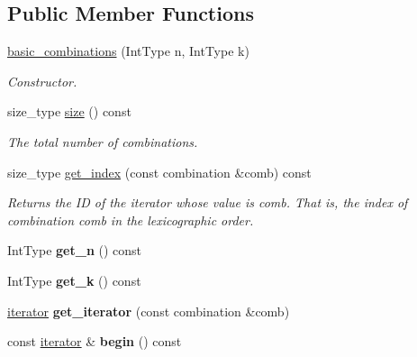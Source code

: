 \subsection*{Public Member Functions}
\begin{DoxyCompactItemize}
\item 
\hyperlink{classdscr_1_1basic__combinations_a0a1c805efc25a065b1f64af7a9e526ca}{basic\-\_\-combinations} (Int\-Type n, Int\-Type k)
\begin{DoxyCompactList}\small\item\em Constructor. \end{DoxyCompactList}\item 
size\-\_\-type \hyperlink{classdscr_1_1basic__combinations_aad12129d764245f4fbae5d777d97228d}{size} () const 
\begin{DoxyCompactList}\small\item\em The total number of combinations. \end{DoxyCompactList}\item 
size\-\_\-type \hyperlink{classdscr_1_1basic__combinations_a3d36156a1aa2ba156696ce8a6569ce70}{get\-\_\-index} (const combination \&comb) const 
\begin{DoxyCompactList}\small\item\em Returns the I\-D of the iterator whose value is comb. That is, the index of combination comb in the lexicographic order. \end{DoxyCompactList}\item 
\hypertarget{classdscr_1_1basic__combinations_ab715609621f607ea0353bcda589e4f47}{Int\-Type {\bfseries get\-\_\-n} () const }\label{classdscr_1_1basic__combinations_ab715609621f607ea0353bcda589e4f47}

\item 
\hypertarget{classdscr_1_1basic__combinations_a7a57a2f9b82d1d8bf7205ba1672e97ca}{Int\-Type {\bfseries get\-\_\-k} () const }\label{classdscr_1_1basic__combinations_a7a57a2f9b82d1d8bf7205ba1672e97ca}

\item 
\hypertarget{classdscr_1_1basic__combinations_adcf9e7e0c890ecfdbe7b9982fba4b104}{\hyperlink{classdscr_1_1basic__combinations_1_1iterator}{iterator} {\bfseries get\-\_\-iterator} (const combination \&comb)}\label{classdscr_1_1basic__combinations_adcf9e7e0c890ecfdbe7b9982fba4b104}

\item 
\hypertarget{classdscr_1_1basic__combinations_ae08cabc1dfbce46ec31b495a02c60286}{const \hyperlink{classdscr_1_1basic__combinations_1_1iterator}{iterator} \& {\bfseries begin} () const }\label{classdscr_1_1basic__combinations_ae08cabc1dfbce46ec31b495a02c60286}


\end{DoxyCompactItemize}
